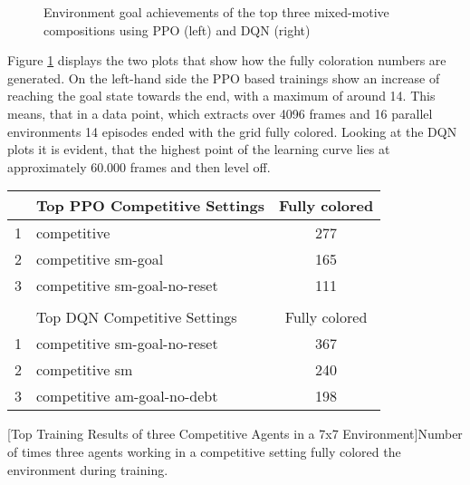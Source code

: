 \begin{figure}[hpbt]
    \centering
    \hspace{0.01\textwidth}
    \caption[Plots of fully coloration achievements of the Top Mixed-Motive Modes in a 7x7 Environment]{Environment goal achievements of the top three mixed-motive compositions using PPO (left) and DQN (right)}
    \label{fig:multipic_plots_mixed_hard}
\end{figure}

Figure \ref{fig:multipic_plots_mixed_hard} displays the two plots that show how the fully coloration numbers are generated. On the left-hand side the PPO based trainings show an increase of reaching the goal state towards the end, with a maximum of around 14. This means, that in a data point, which extracts over 4096 frames and 16 parallel environments 14 episodes ended with the grid fully colored. Looking at the DQN plots it is evident, that the highest point of the learning curve lies at approximately 60.000 frames and then level off.

\begin{center}
\begin{tabular}{clc}\hline
      & Top PPO Competitive Settings & Fully colored \\ \hline
    {\small 1} & competitive & 277 \\
    {\small 2} & competitive sm-goal & 165 \\
    {\small 3} & competitive sm-goal-no-reset & 111 \\ \hline
      &   \\ \hline
      & Top DQN Competitive Settings & Fully colored \\ \hline
    {\small 1} & competitive sm-goal-no-reset & 367 \\
    {\small 2} & competitive sm & 240 \\
    {\small 3} & competitive am-goal-no-debt & 198 \\ \hline
    \end{tabular}
    [Top Training Results of three Competitive Agents in a 7x7 Environment]{Number of times three agents working in a competitive setting fully colored the environment during training.}\label{t:3-comp-hard}
\end{center}

